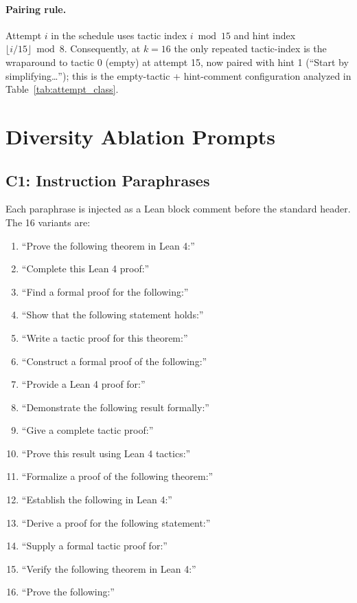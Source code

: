 \documentclass{article}
\begin{document}
\paragraph{Pairing rule.}
Attempt $i$ in the schedule uses tactic index $i \bmod 15$ and hint index $\lfloor i / 15 \rfloor \bmod 8$. Consequently, at $k{=}16$ the only repeated tactic-index is the wraparound to tactic 0 (empty) at attempt 15, now paired with hint 1 (``Start by simplifying\dots''); this is the empty-tactic + hint-comment configuration analyzed in Table~\ref{tab:attempt_class}.

\section{Diversity Ablation Prompts}
\label{app:ablation}

\subsection{C1: Instruction Paraphrases}
Each paraphrase is injected as a Lean block comment before the standard header. The 16 variants are:
\begin{enumerate}
\item ``Prove the following theorem in Lean 4:''
\item ``Complete this Lean 4 proof:''
\item ``Find a formal proof for the following:''
\item ``Show that the following statement holds:''
\item ``Write a tactic proof for this theorem:''
\item ``Construct a formal proof of the following:''
\item ``Provide a Lean 4 proof for:''
\item ``Demonstrate the following result formally:''
\item ``Give a complete tactic proof:''
\item ``Prove this result using Lean 4 tactics:''
\item ``Formalize a proof of the following theorem:''
\item ``Establish the following in Lean 4:''
\item ``Derive a proof for the following statement:''
\item ``Supply a formal tactic proof for:''
\item ``Verify the following theorem in Lean 4:''
\item ``Prove the following:''
\end{enumerate}
\end{document}
